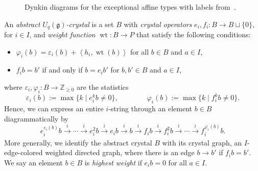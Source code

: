 \documentclass[reqno]{amsart}
\newcommand{\g}{\mathfrak{g}}
\newcommand{\inner}[2]{\left\langle #1, #2 \right\rangle}
\DeclareMathOperator{\wt}{wt} %
\newcommand{\ZZ}{\mathbb{Z}}
\newcommand{\defn}[1]{{\color{darkred}\emph{#1}}} %
\theoremstyle{plain}
\theoremstyle{definition}
\numberwithin{equation}{section}
\begin{document}
\begin{figure}[t]
\begin{center}
\end{center}
\caption{Dynkin diagrams for the exceptional affine types with labels from~\cite{kac90}.}
\label{figure:exceptional_types}
\end{figure}

An \defn{abstract $U_q(\g)$-crystal} is a set $B$ with \defn{crystal operators} $e_i, f_i \colon B \to B \sqcup \{0\}$, for $i \in I$, and \defn{weight function} $\wt \colon B \to P$ that satisfy the following conditions:
\begin{itemize}
\item[(1)] $\varphi_i(b) = \varepsilon_i(b) + \inner{h_i}{\wt(b)}$ for all $b \in B$ and $a \in I$,
\item[(2)] $f_i b = b'$ if and only if $b = e_i b'$ for $b, b' \in B$ and $a \in I$,
\end{itemize}
where $\varepsilon_i, \varphi_i \colon  B \to \ZZ_{\geq 0}$ are the statistics
\[
\varepsilon_i(b) := \max \{ k \mid e_i^k b \neq 0 \},
\qquad \qquad \varphi_i(b) := \max \{ k \mid f_i^k b \neq 0 \}.
\]
Hence, we can express an entire $i$-string through an element $b \in B$ diagrammatically by
\[
e_i^{\varepsilon_i(b)}b \xrightarrow[\hspace{12pt}]{i}
\cdots \xrightarrow[\hspace{12pt}]{i}
e_i^2 b \xrightarrow[\hspace{12pt}]{i}
e_i b \xrightarrow[\hspace{12pt}]{i}
b \xrightarrow[\hspace{12pt}]{i}
f_i b \xrightarrow[\hspace{12pt}]{i}
f_i^2 b \xrightarrow[\hspace{12pt}]{i}
\cdots \xrightarrow[\hspace{12pt}]{i}
f_i^{\varphi_i(b)}b.
\]
More generally, we identify the abstract crystal $B$ with its crystal graph, an $I$-edge-colored weighted directed graph, where there is an edge $b \to b'$ if $f_i b = b'$.
We say an element $b \in B$ is \defn{highest weight} if $e_i b = 0$ for all $a \in I$.
\end{document}
